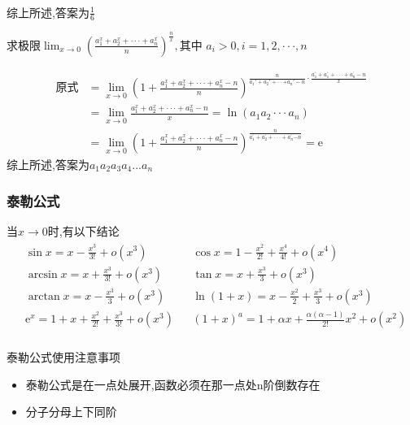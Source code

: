 \documentclass[12pt, a4paper, oneside, UTF8]{ctexbook}  %
\begin{document}
\begin{itemize}
\begin{solution}
\begin{align*}
              \end{align*}
              综上所述,答案为$\frac{1}{6}$
          \end{solution}
          \begin{problem}
          $\text{求极限}\lim_{x\to0}\left(\frac{a_1^x+a_2^x+\cdotp\cdotp\cdotp+a_n^x}n\right)^{\frac nx},\text{其中 }a_i>0,i=1,2,\cdotp\cdotp\cdotp,n$
          \end{problem}
          \begin{solution}
              \begin{align*}
                  \text{原式} & = \lim_{x\to0}\left(1+\frac{a_1^x+a_2^x+\cdotp\cdotp\cdotp+a_n^x-n}n\right)^{\frac n{a_1'+a_2'+\cdotp\cdotp+a_n'-n}\cdot\frac{a_1^{\prime}+a_1^{\prime}+\cdotp\cdotp\cdotp+a_n^{\prime}-n}x} \\
                            & = \lim_{x\to0}\frac{a_1^x+a_2^x+\cdotp\cdotp\cdotp+a_n^x-n}x=\ln(a_1a_2\cdotp\cdotp\cdotp a_n)                                                                                               \\
                            & = \lim_{x\to0}\left(1+\frac{a_1^x+a_2^x+\cdot\cdot\cdot+a_n^x-n}n\right)^{\frac n{a_1^{\prime}+a_2^{\prime}+\cdot\cdot\cdot+a_n^{\prime}{-n}}}=\mathrm{e}
              \end{align*}
              综上所述,答案为$a_1a_2a_3a_4...a_n$
          \end{solution}
\end{itemize}
\subsubsection{泰勒公式}
当$x\to 0$时,有以下结论
\begin{align*}
    \boxed{\begin{aligned}
                    & \sin x =x-\frac{x^3}{3!}+o(x^3)                                &  & \cos x =1-\frac{x^2}{2!}+\frac{x^4}{4!}+o(x^4)                  \\
                    & \arcsin x =x+\frac{x^3}{3!}+o(x^3)                             &  & \tan x =x+\frac{x^3}3+o(x^3)                                    \\
                    & \arctan x =x-\frac{x^{3}}{3}+o(x^{3})                          &  & \ln(1+x) =x-\frac{x^{2}}{2}+\frac{x^{3}}{3}+o(x^{3})            \\
                    & \mathrm{e}^{x} =1+x+\frac{x^{2}}{2!}+\frac{x^{3}}{3!}+o(x^{3}) &  & (1+x)^{a} =1+\alpha x+\frac{\alpha(\alpha-1)}{2!}x^{2}+o(x^{2}) \\
               \end{aligned}}
\end{align*}
\begin{criterion}{泰勒公式使用注意事项}{}
    \begin{itemize}
        \item 泰勒公式是在一点处展开,函数必须在那一点处n阶倒数存在
        \item 分子分母上下同阶
    \end{itemize}
\end{criterion}
\end{document}
